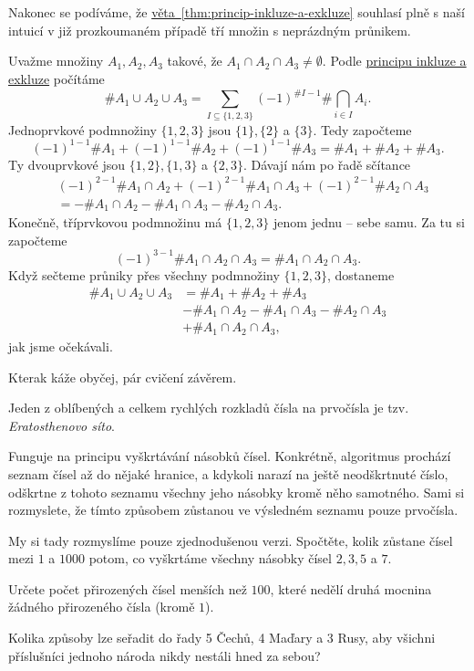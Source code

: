 Nakonec se podíváme, že
\hyperref[thm:princip-inkluze-a-exkluze]{věta~\ref*{thm:princip-inkluze-a-exkluze}}
souhlasí plně s naší intuicí v již prozkoumaném případě tří množin s neprázdným
průnikem.

\begin{example}
 Uvažme množiny $A_1,A_2,A_3$ takové, že $A_1 \cap A_2 \cap A_3 \neq \emptyset$.
 Podle \hyperref[thm:princip-inkluze-a-exkluze]{principu inkluze a exkluze}
 počítáme
 \[
  \# A_1 \cup A_2 \cup A_3 = \sum_{I \subseteq \{1,2,3\}}^{} (-1)^{\#I - 1}\#
  \bigcap_{i \in  I}^{} A_i.
 \]
 Jednoprvkové podmnožiny $\{1,2,3\}$ jsou $\{1\}, \{2\}$ a $\{3\}$. Tedy
 započteme
 \[
  (-1)^{1-1} \# A_1 + (-1)^{1-1}\# A_2 + (-1)^{1-1}\# A_3 = \# A_1 + \# A_2 + \#
  A_3.
 \]
 Ty dvouprvkové jsou $\{1,2\}, \{1,3\}$ a $\{2,3\}$. Dávají nám po řadě sčítance
 \begin{align*}
  &(-1)^{2-1}\# A_1 \cap A_2 + (-1)^{2-1}\# A_1 \cap A_3 + (-1)^{2-1}\# A_2 \cap
  A_3\\
  &= -\# A_1 \cap A_2 - \# A_1 \cap A_3 - \#A_2 \cap A_3.
 \end{align*}
 Konečně, tříprvkovou podmnožinu má $\{1,2,3\}$ jenom jednu -- sebe samu. Za tu
 si započteme
 \[
  (-1)^{3-1}\#A_1 \cap A_2 \cap A_3 = \# A_1 \cap A_2 \cap A_3.
 \]
 Když sečteme průniky přes všechny podmnožiny $\{1,2,3\}$, dostaneme
 \begin{align*}
  \# A_1 \cup A_2 \cup A_3 &= \#A_1 + \#A_2 + \#A_3\\
  &-\#A_1 \cap A_2 - \#A_1 \cap A_3 - \#A_2 \cap A_3\\
  &+ \# A_1 \cap A_2 \cap A_3,
 \end{align*}
 jak jsme očekávali.
\end{example}

Kterak káže obyčej, pár cvičení závěrem.

\begin{exercise}
 Jeden z oblíbených a celkem rychlých rozkladů čísla na prvočísla je tzv.
 \emph{Eratosthenovo síto}.
 
 Funguje na principu vyškrtávání násobků čísel. Konkrétně, algoritmus prochází
 seznam čísel až do nějaké hranice, a kdykoli narazí na ještě neodškrtnuté
 číslo, odškrtne z tohoto seznamu všechny jeho násobky kromě něho samotného.
 Sami si rozmyslete, že tímto způsobem zůstanou ve výsledném seznamu pouze
 prvočísla.

 My si tady rozmyslíme pouze zjednodušenou verzi. Spočtěte, kolik zůstane čísel
 mezi $1$ a $1000$ potom, co vyškrtáme všechny násobky čísel $2,3,5$ a $7$.
\end{exercise}

\begin{exercise}
 Určete počet přirozených čísel menších než $100$, které nedělí druhá mocnina
 žádného přirozeného čísla (kromě $1$).
\end{exercise}

\begin{exercise}
 Kolika způsoby lze seřadit do řady 5 Čechů, 4 Maďary a 3 Rusy, aby všichni
 příslušníci jednoho národa nikdy nestáli hned za sebou?
\end{exercise}


